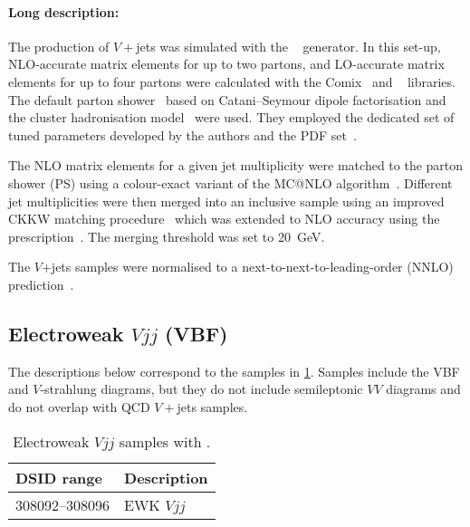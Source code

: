 \paragraph{Long description:}

The production of \(V+\)jets was simulated with the \SHERPA[2.2.1]~\cite{Bothmann:2019yzt}
generator. In this set-up, NLO-accurate matrix elements for up to two partons, and LO-accurate matrix elements for up
to four partons were calculated with the Comix~\cite{Gleisberg:2008fv} and
\OPENLOOPS~\cite{Buccioni:2019sur,Cascioli:2011va,Denner:2016kdg} libraries.
The default \SHERPA parton shower~\cite{Schumann:2007mg} based on
Catani--Seymour dipole factorisation and the cluster hadronisation model~\cite{Winter:2003tt}
were used. They employed the dedicated set of tuned parameters developed by the
\SHERPA authors and the \NNPDF[3.0nnlo] PDF set~\cite{Ball:2014uwa}.

The NLO matrix elements for a given jet multiplicity were matched to the parton
shower (PS) using a colour-exact variant of the MC@NLO
algorithm~\cite{Hoeche:2011fd}. Different jet multiplicities were then merged
into an inclusive sample using an improved CKKW matching
procedure~\cite{Catani:2001cc,Hoeche:2009rj} which was extended to NLO
accuracy using the \MEPSatNLO prescription~\cite{Hoeche:2012yf}. The merging threshold
was set to \SI{20}{\GeV}.



The \(V\)+jets samples were normalised to a next-to-next-to-leading-order (NNLO)
prediction~\cite{Anastasiou:2003ds}.


\subsection{Electroweak \(Vjj\) (VBF)}

The descriptions below correspond to the samples in
\cref{tab:ewkvjets-sherpa}.  Samples include the VBF and \(V\)-strahlung diagrams, but
they do not include semileptonic \(VV\) diagrams and do not overlap with QCD \(V+\)jets samples.

\begin{table}[!htbp]
  \caption{Electroweak \(Vjj\) samples with \SHERPA.}%
  \label{tab:ewkvjets-sherpa}
  \centering
  \begin{tabular}{l l}
    \toprule
    DSID range & Description \\
    \midrule
    308092--308096 & EWK \(Vjj\) \\
    \bottomrule
  \end{tabular}
\end{table}

